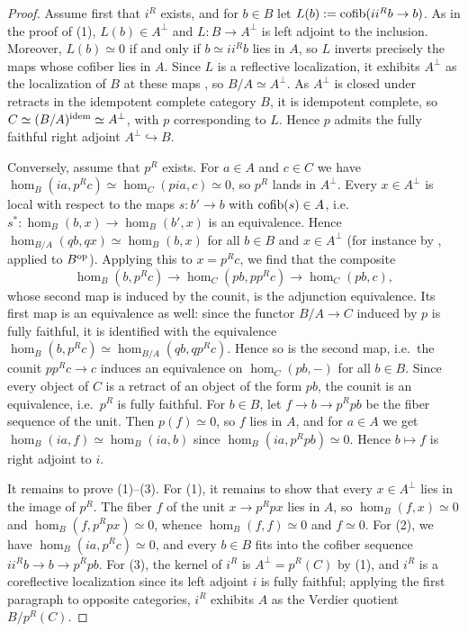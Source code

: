 	\begin{proof}
		Assume first that $i^R$ exists, and for $b \in B$ let $L(b) := \operatorname{cofib}(ii^Rb \to b)$. As in the proof of (1), $L(b) \in A^{\perp}$ and $L\colon B \to A^{\perp}$ is left adjoint to the inclusion. Moreover, $L(b) \simeq 0$ if and only if $b \simeq ii^Rb$ lies in $A$, so $L$ inverts precisely the maps whose cofiber lies in $A$. Since $L$ is a reflective localization, it exhibits $A^{\perp}$ as the localization of $B$ at these maps \cite[Proposition~5.2.7.12]{lurie2009HTT}, so $B/A \simeq A^{\perp}$. As $A^{\perp}$ is closed under retracts in the idempotent complete category $B$, it is idempotent complete, so $C \simeq (B/A)^{\operatorname{idem}} \simeq A^{\perp}$, with $p$ corresponding to $L$. Hence $p$ admits the fully faithful right adjoint $A^{\perp} \hookrightarrow B$.

		Conversely, assume that $p^R$ exists. For $a \in A$ and $c \in C$ we have $\hom_B(ia,p^Rc) \simeq \hom_C(pia,c) \simeq 0$, so $p^R$ lands in $A^{\perp}$. Every $x \in A^{\perp}$ is local with respect to the maps $s\colon b' \to b$ with $\operatorname{cofib}(s) \in A$, i.e.\ $s^*\colon \hom_B(b,x) \to \hom_B(b',x)$ is an equivalence. Hence $\hom_{B/A}(qb,qx) \simeq \hom_B(b,x)$ for all $b \in B$ and $x \in A^{\perp}$ (for instance by , applied to $B^{\textup{op}}$). Applying this to $x = p^Rc$, we find that the composite
		\[
			\hom_B(b,p^Rc) \to \hom_C(pb,pp^Rc) \to \hom_C(pb,c),
		\]
		whose second map is induced by the counit, is the adjunction equivalence. Its first map is an equivalence as well: since the functor $B/A \to C$ induced by $p$ is fully faithful, it is identified with the equivalence $\hom_B(b,p^Rc) \simeq \hom_{B/A}(qb,qp^Rc)$. Hence so is the second map, i.e.\ the counit $pp^Rc \to c$ induces an equivalence on $\hom_C(pb,-)$ for all $b \in B$. Since every object of $C$ is a retract of an object of the form $pb$, the counit is an equivalence, i.e.\ $p^R$ is fully faithful. For $b \in B$, let $f \to b \to p^Rpb$ be the fiber sequence of the unit. Then $p(f) \simeq 0$, so $f$ lies in $A$, and for $a \in A$ we get $\hom_B(ia,f) \simeq \hom_B(ia,b)$ since $\hom_B(ia,p^Rpb) \simeq 0$. Hence $b \mapsto f$ is right adjoint to $i$.

		It remains to prove (1)--(3). For (1), it remains to show that every $x \in A^{\perp}$ lies in the image of $p^R$. The fiber $f$ of the unit $x \to p^Rpx$ lies in $A$, so $\hom_B(f,x) \simeq 0$ and $\hom_B(f,p^Rpx) \simeq 0$, whence $\hom_B(f,f) \simeq 0$ and $f \simeq 0$. For (2), we have $\hom_B(ia,p^Rc) \simeq 0$, and every $b \in B$ fits into the cofiber sequence $ii^Rb \to b \to p^Rpb$. For (3), the kernel of $i^R$ is $A^{\perp} = p^R(C)$ by (1), and $i^R$ is a coreflective localization since its left adjoint $i$ is fully faithful; applying the first paragraph to opposite categories, $i^R$ exhibits $A$ as the Verdier quotient $B/p^R(C)$.
	\end{proof}

